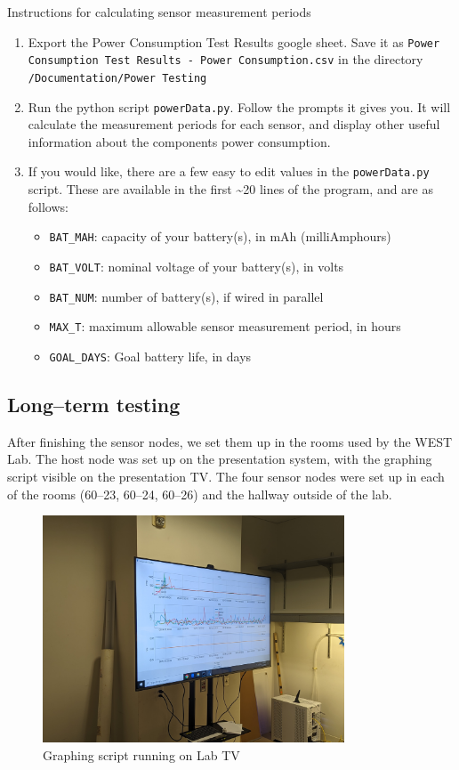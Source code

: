 Instructions for calculating sensor measurement periods
\begin{enumerate}
\item Export the Power Consumption Test Results google sheet. Save it as \texttt{Power Consumption Test Results - Power Consumption.csv} in the directory \\\texttt{/Documentation/Power Testing}
\item Run the python script \texttt{powerData.py}. Follow the prompts it gives you. It will calculate the measurement periods for each sensor, and display other useful information about the components power consumption.
\item If you would like, there are a few easy to edit values in the \texttt{powerData.py} script. These are available in the first \textasciitilde20 lines of the program, and are as follows:
\begin{itemize}
    \item \texttt{BAT\_MAH}: capacity of your battery(s), in mAh (milliAmp\-hours)
    \item \texttt{BAT\_VOLT}: nominal voltage of your battery(s), in volts
    \item \texttt{BAT\_NUM}: number of battery(s), if wired in parallel
    \item \texttt{MAX\_T}: maximum allowable sensor measurement period, in hours
    \item \texttt{GOAL\_DAYS}: Goal battery life, in days
\end{itemize}
\end{enumerate}
\newpage

\subsection{Long--term testing}
After finishing the sensor nodes, we set them up in the rooms used by the WEST Lab.  The host node was set up on the presentation system, with the graphing script visible on the presentation TV. The four sensor nodes were set up in each of the rooms (60--23, 60--24, 60--26) and the hallway outside of the lab.

\begin{figure}[H]
    \centering
    \includegraphics[width=0.8\textwidth]{Pictures/Lab TV.jpg}
    \caption[Graphing script running on Lab TV]{Graphing script running on Lab TV}
    \label{fig:Graphing script running on Lab TV}
\end{figure}

